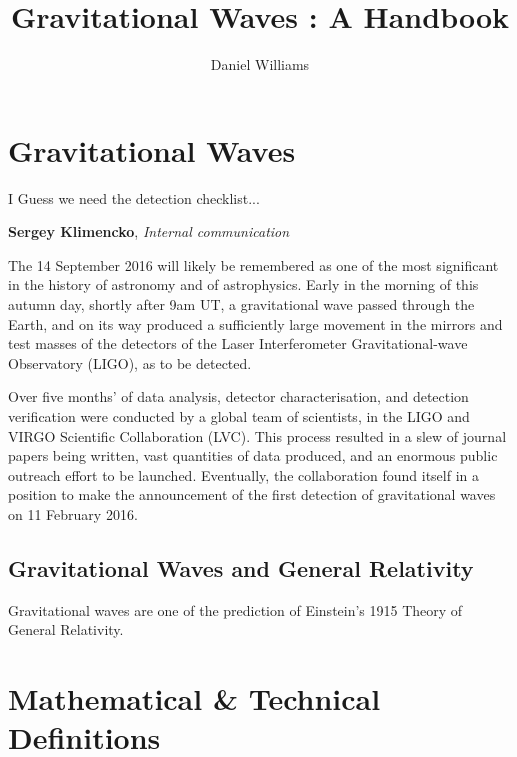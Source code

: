 \documentclass{kentigern}
\title{Gravitational Waves : A Handbook}
\author{Daniel Williams}
\begin{document}
\maketitle

\newpage

\tableofcontents

\chapter{Gravitational Waves}
\label{cha:grav-waves}


\epigraph{I Guess we need the detection checklist...}{\textbf{Sergey Klimencko}, \emph{Internal communication}}

The 14 September 2016 will likely be remembered as one of the most
significant in the history of astronomy and of astrophysics. Early in
the morning of this autumn day, shortly after 9am UT, a gravitational
wave passed through the Earth, and on its way produced a sufficiently
large movement in the mirrors and test masses of the detectors of the
Laser Interferometer Gravitational-wave Observatory (\gls{LIGO}), as to be
detected.

Over five months' of data analysis, detector characterisation, and
detection verification were conducted by a global team of scientists,
in the LIGO and VIRGO Scientific Collaboration (LVC). This process
resulted in a slew of journal papers being written, vast quantities of
data produced, and an enormous public outreach effort to be
launched. Eventually, the collaboration found itself in a position to
make the announcement of the first detection of gravitational waves on
11 February 2016.


\section{Gravitational Waves and General Relativity}
\label{sec:grav-waves-gener}

Gravitational waves are one of the prediction of Einstein's 1915 Theory of General Relativity.

\chapter{Mathematical \& Technical Definitions}
\label{cha:math--techn}
\end{document}
